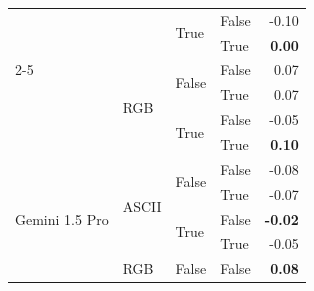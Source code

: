 \begin{tabular}{@{}llllr@{}}
                                                                        &                           & \multirow[c]{2}{*}{True}  & False                     & -0.10 \\
                                                                        &                           &                           & True                      & \textbf{0.00} \\
    \cmidrule{2-5}                                                                                                                                             
                                                                        & \multirow[c]{4}{*}{RGB}   & \multirow[c]{2}{*}{False} & False                     & 0.07 \\
                                                                        &                           &                           & True                      & 0.07 \\
                                                                        &                           & \multirow[c]{2}{*}{True}  & False                     & -0.05 \\
                                                                        &                           &                           & True                      & \textbf{0.10} \\
    \midrule                                                                                                                                                   
    \multirow[c]{8}{*}{Gemini 1.5 Pro}                                  & \multirow[c]{4}{*}{ASCII} & \multirow[c]{2}{*}{False} & False                     & -0.08 \\
                                                                        &                           &                           & True                      & -0.07 \\
                                                                        &                           & \multirow[c]{2}{*}{True}  & False                     & \textbf{-0.02} \\
                                                                        &                           &                           & True                      & -0.05 \\
    \cmidrule{2-5}                                                                                                                                             
                                                                        & \multirow[c]{4}{*}{RGB}   & \multirow[c]{2}{*}{False} & False                     & \textbf{0.08} \\

\end{tabular}
